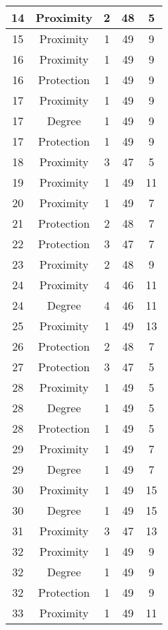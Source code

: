 \documentclass[results.tex]{subfiles}
\begin{document}
\begin{center}
\begin{tabular}{| c || c | c | c | c |}
    \hline
    14 & Proximity & 2 & 48 & 5 \\ 
    \hline
    15 & Proximity & 1 & 49 & 9 \\ 
    \hline
    16 & Proximity & 1 & 49 & 9 \\ 
    \hline
    16 & Protection & 1 & 49 & 9 \\ 
    \hline
    17 & Proximity & 1 & 49 & 9 \\ 
    \hline
    17 & Degree & 1 & 49 & 9 \\ 
    \hline
    17 & Protection & 1 & 49 & 9 \\ 
    \hline
    18 & Proximity & 3 & 47 & 5 \\ 
    \hline
    19 & Proximity & 1 & 49 & 11 \\ 
    \hline
    20 & Proximity & 1 & 49 & 7 \\ 
    \hline
    21 & Protection & 2 & 48 & 7 \\ 
    \hline
    22 & Protection & 3 & 47 & 7 \\ 
    \hline
    23 & Proximity & 2 & 48 & 9 \\ 
    \hline
    24 & Proximity & 4 & 46 & 11 \\ 
    \hline
    24 & Degree & 4 & 46 & 11 \\ 
    \hline
    25 & Proximity & 1 & 49 & 13 \\ 
    \hline
    26 & Protection & 2 & 48 & 7 \\ 
    \hline
    27 & Protection & 3 & 47 & 5 \\ 
    \hline
    28 & Proximity & 1 & 49 & 5 \\ 
    \hline
    28 & Degree & 1 & 49 & 5 \\ 
    \hline
    28 & Protection & 1 & 49 & 5 \\ 
    \hline
    29 & Proximity & 1 & 49 & 7 \\ 
    \hline
    29 & Degree & 1 & 49 & 7 \\ 
    \hline
    30 & Proximity & 1 & 49 & 15 \\ 
    \hline
    30 & Degree & 1 & 49 & 15 \\ 
    \hline
    31 & Proximity & 3 & 47 & 13 \\ 
    \hline
    32 & Proximity & 1 & 49 & 9 \\ 
    \hline
    32 & Degree & 1 & 49 & 9 \\ 
    \hline
    32 & Protection & 1 & 49 & 9 \\ 
    \hline
    33 & Proximity & 1 & 49 & 11 \\ 

\end{tabular}
\end{center}
\end{document}
